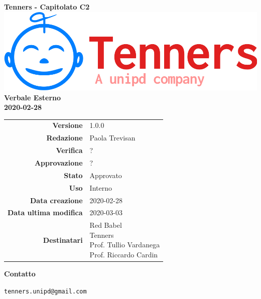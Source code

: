 \begin{titlepage}
	\begin{center}
		\large \textbf{Tenners - Capitolato C2}
		\vfill
		\includegraphics[scale = 0.3]{./res/img/logo.png}\\
		\vfill
		\Huge \textbf{Verbale Esterno} \\
		\textbf {2020-02-28}

        \vfill
        \large

        \begin{tabular}{r|l}
        	\textbf{Versione} & 1.0.0 \\
        	\textbf{Redazione} & Paola Trevisan \\
        	\textbf{Verifica} &  ? \\
        	\textbf{Approvazione} & ? \\
        	\textbf{Stato} & Approvato \\
        	\textbf{Uso} &  Interno\\
        	\textbf{Data creazione} &  2020-02-28\\
        	\textbf{Data ultima modifica} & 2020-03-03 \\
        	\textbf{Destinatari} & \parbox[t]{5cm}{Red Babel\\Tenners \\ Prof. Tullio Vardanega\\ Prof. Riccardo Cardin}
        \end{tabular}
    	\vfill
    	\normalsize
    	\vfill
    	\textbf{Contatto}
    	
    	\texttt{tenners.unipd@gmail.com}

	\end{center}
\end{titlepage}
